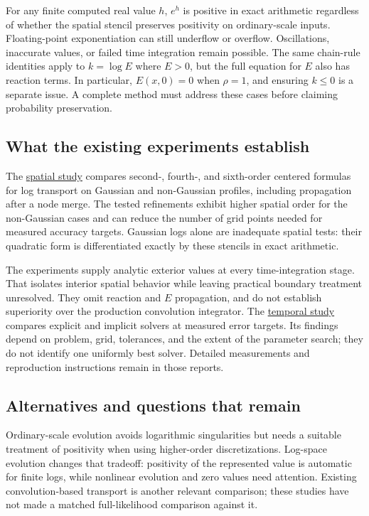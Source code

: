\documentclass[11pt]{article}
\begin{document}
For any finite computed real value $h$, $e^h$ is positive in exact arithmetic regardless of whether
the spatial stencil preserves positivity on ordinary-scale inputs. Floating-point exponentiation
can still underflow or overflow. Oscillations, inaccurate values, or failed time integration remain
possible. The same chain-rule identities apply to $k=\log E$ where $E>0$, but the full equation for
$E$ also has reaction terms. In particular, $E(x,0)=0$ when $\rho=1$, and ensuring $k\leq0$ is a
separate issue. A complete method must address these cases before claiming probability preservation.

\subsection{What the existing experiments establish}
The \href{../../validation/log_pde/README.md}{spatial study} compares second-, fourth-, and
sixth-order centered formulas for log transport on Gaussian and non-Gaussian profiles, including
propagation after a node merge. The tested refinements exhibit higher spatial order for the
non-Gaussian cases and can reduce the number of grid points needed for measured accuracy targets.
Gaussian logs alone are inadequate spatial tests: their quadratic form is differentiated exactly
by these stencils in exact arithmetic.

The experiments supply analytic exterior values at every time-integration stage. That isolates
interior spatial behavior while leaving practical boundary treatment unresolved. They omit reaction
and $E$ propagation, and do not establish superiority over the production convolution integrator.
The \href{../../validation/log_pde/temporal/README.md}{temporal study} compares explicit and implicit
solvers at measured error targets. Its findings depend on problem, grid, tolerances, and the extent
of the parameter search; they do not identify one uniformly best solver. Detailed measurements and
reproduction instructions remain in those reports.

\subsection{Alternatives and questions that remain}
Ordinary-scale evolution avoids logarithmic singularities but needs a suitable treatment of
positivity when using higher-order discretizations. Log-space evolution changes that tradeoff:
positivity of the represented value is automatic for finite logs, while nonlinear evolution and
zero values need attention. Existing convolution-based transport is another relevant comparison;
these studies have not made a matched full-likelihood comparison against it.
\end{document}
